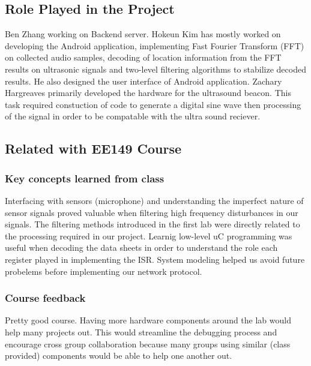 \appendix

\subsection{Role Played in the Project}
\label{sec:role-played-project}
Ben Zhang working on Backend server.
Hokeun Kim has mostly worked on developing the Android application, implementing Fast Fourier Transform (FFT) on collected audio samples, decoding of location information from the FFT results on ultrasonic signals and two-level filtering algorithms to stabilize decoded results. He also designed the user interface of Android application.
Zachary Hargreaves primarily developed the hardware for the ultrasound beacon.  This task required constuction of code to generate a digital sine wave then processing of the signal in order to be compatable with the ultra sound reciever.   

\subsection{Related with EE149 Course}
\label{sec:related-with-ee149}
\subsubsection{Key concepts learned from class}
\label{sec:key-concepts-learned}

Interfacing with sensors (microphone) and understanding the imperfect nature of sensor signals proved valuable when filtering high frequency disturbances in our signals.  The filtering methods introduced in the first lab were directly related to the processing required in our project.  Learnig low-level uC programming was useful when decoding the data sheets in order to understand the role each register played in implementing the ISR.  System modeling helped us avoid future probelems before implementing our network protocol.

\subsubsection{Course feedback}
\label{sec:course-feedback}
Pretty good course. Having more hardware components around the lab would help many projects out. This would streamline the debugging process and encourage cross group collaboration because many groups using similar (class provided) components would be able to help one another out.  

